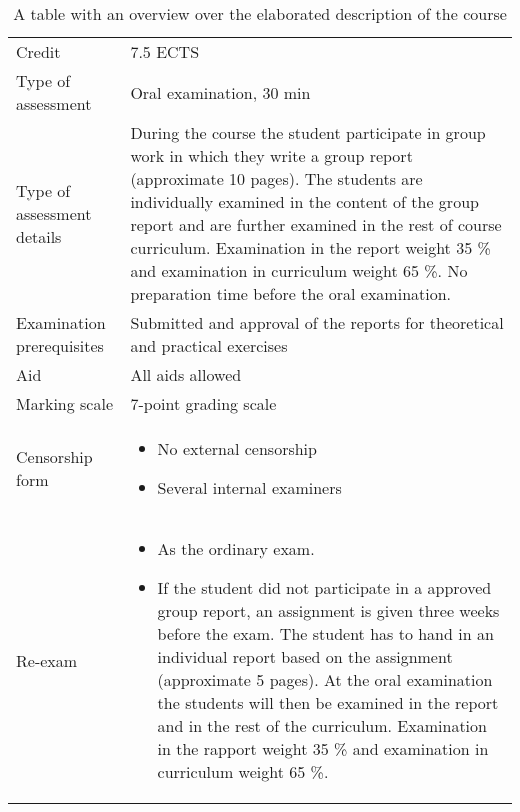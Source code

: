 \begin{table}[h]
    \centering
    \caption{A table with an overview over the elaborated description of the course}
    \label{tab:elaborated_description}
    \begin{tabular}{ l | p{10cm} }
        Credit & 7.5 ECTS \\ 
        
        Type of assessment & Oral examination, 30 min \\ 

        Type of assessment details & During the course the student participate in group work in which they write a group report (approximate 10 pages). The students are individually examined in the content of the group report and are further examined in the rest of course curriculum. Examination in the report weight 35 \% and examination in curriculum weight 65 \%. No preparation time before the oral examination. \\

        Examination prerequisites & Submitted and approval of the reports for theoretical and practical exercises \\ 

        Aid & All aids allowed \\

        Marking scale & 7-point grading scale \\

        Censorship form &   \begin{itemize}
                                \item No external censorship
                                \item Several internal examiners
                            \end{itemize} \\

        Re-exam &   \begin{itemize}
                        \item As the ordinary exam.

                        \item If the student did not participate in a approved group report, an assignment is given three weeks before the exam. The student has to hand in an individual report based on the assignment (approximate 5 pages). At the oral examination the students will then be examined in the report and in the rest of the curriculum. Examination in the rapport weight 35 \% and examination in curriculum weight 65 \%.
                    \end{itemize} \\ 
    \end{tabular}
\end{table}


\newpage